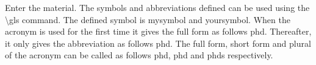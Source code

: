 Enter the material. The symbols and abbreviations defined can be used using the \textbackslash gls command. The defined symbol is \gls{mysymbol} and \gls{yoursymbol}. When the acronym is used for the first time it gives the full form as follows \gls{phd}. Thereafter, it only gives the abbreviation as follows \gls{phd}. The full form, short form and plural of the acronym can be called as follows \acrfull{phd}, \acrshort{phd} and \glspl{phd} respectively.